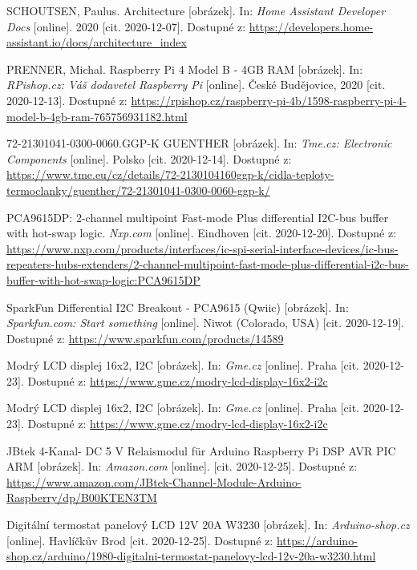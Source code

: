 \begin{thebibliography}{3}
SCHOUTSEN, Paulus. Architecture [obrázek]. In: \textit{Home Assistant Developer Docs} [online]. 2020 [cit. 2020-12-07]. Dostupné z: \url{https://developers.home-assistant.io/docs/architecture\_index}

PRENNER, Michal. Raspberry Pi 4 Model B - 4GB RAM [obrázek]. In: \textit{RPishop.cz: Váš dodavetel Raspberry Pi} [online]. České Budějovice, 2020 [cit. 2020-12-13]. Dostupné z: \url{https://rpishop.cz/raspberry-pi-4b/1598-raspberry-pi-4-model-b-4gb-ram-765756931182.html}

72-21301041-0300-0060.GGP-K GUENTHER [obrázek]. In: \textit{Tme.cz: Electronic Components} [online]. Polsko [cit. 2020-12-14]. Dostupné z: \url{https://www.tme.eu/cz/details/72-2130104160ggp-k/cidla-teploty-termoclanky/guenther/72-21301041-0300-0060-ggp-k/}

PCA9615DP: 2-channel multipoint Fast-mode Plus differential I2C-bus buffer with hot-swap logic. \textit{Nxp.com} [online]. Eindhoven [cit. 2020-12-20]. Dostupné z: \url{https://www.nxp.com/products/interfaces/ic-spi-serial-interface-devices/ic-bus-repeaters-hubs-extenders/2-channel-multipoint-fast-mode-plus-differential-i2c-bus-buffer-with-hot-swap-logic:PCA9615DP}

SparkFun Differential I2C Breakout - PCA9615 (Qwiic) [obrázek]. In: \textit{Sparkfun.com: Start something} [online]. Niwot (Colorado, USA) [cit. 2020-12-19]. Dostupné z: \url{https://www.sparkfun.com/products/14589}

Modrý LCD displej 16x2, I2C [obrázek]. In: \textit{Gme.cz} [online]. Praha [cit. 2020-12-23]. Dostupné z: \url{https://www.gme.cz/modry-lcd-display-16x2-i2c}

Modrý LCD displej 16x2, I2C [obrázek]. In: \textit{Gme.cz} [online]. Praha [cit. 2020-12-23]. Dostupné z: \url{https://www.gme.cz/modry-lcd-display-16x2-i2c}

JBtek 4-Kanal- DC 5 V Relaismodul für Arduino Raspberry Pi DSP AVR PIC ARM [obrázek]. In: \textit{Amazon.com} [online]. [cit. 2020-12-25]. Dostupné z: \url{https://www.amazon.com/JBtek-Channel-Module-Arduino-Raspberry/dp/B00KTEN3TM}

Digitální termostat panelový LCD 12V 20A W3230 [obrázek]. In: \textit{Arduino-shop.cz} [online]. Havlíčkův Brod [cit. 2020-12-25]. Dostupné z: \url{https://arduino-shop.cz/arduino/1980-digitalni-termostat-panelovy-lcd-12v-20a-w3230.html}


\end{thebibliography}
